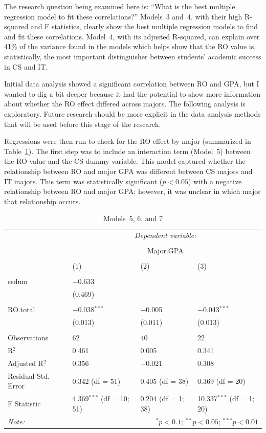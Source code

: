 The research question being examined here is: ``What is the best multiple regression model to fit these correlations?'' Models~3 and~4, with their high R-squared and F statistics, clearly show the best multiple regression models to find and fit these correlations. Model~4, with its adjusted R-squared, can explain over 41\% of the variance found in the models which helps show that the RO value is, statistically, the most important distinguisher between students' academic success in CS and IT.

Initial data analysis showed a significant correlation between RO and GPA, but I wanted to dig a bit deeper because it had the potential to show more information about whether the RO effect differed across majors. The following analysis is exploratory. Future research should be more explicit in the data analysis methods that will be used before this stage of the research.

Regressions were then run to check for the RO effect by major (summarized in Table~\ref{tab:models567}). The first step was to include an interaction term (Model~5) between the RO value and the CS dummy variable. This model captured whether the relationship between RO and major GPA was different between CS majors and IT majors. This term was statistically significant ($p<0.05$) with a negative relationship between RO and major GPA; however, it was unclear in which major that relationship occurs.

\begin{table}[!htbp] \centering
  \caption{Models~5, 6, and 7}
  \label{tab:models567}
  \begin{tabular}{@{\extracolsep{5pt}}llll}
    \toprule
     & \multicolumn{3}{c}{\textit{Dependent variable:}} \\
    \cline{2-4}
    \\[-1.8ex] & \multicolumn{3}{c}{Major.GPA} \\
    \\[-1.8ex] & (1) & (2) & (3)\\
    \hline \\[-1.8ex]
    csdum & $-$0.633 &  &  \\
      & (0.469) &  &  \\
      & & & \\
    RO.total & $-$0.038$^{***}$ & $-$0.005 & $-$0.043$^{***}$ \\
      & (0.013) & (0.011) & (0.013) \\
      & & & \\
    \midrule
    Observations & 62 & 40 & 22 \\
    R$^{2}$ & 0.461 & 0.005 & 0.341 \\
    Adjusted R$^{2}$ & 0.356 & $-$0.021 & 0.308 \\
    Residual Std. Error & 0.342 (df = 51) & 0.405 (df = 38) & 0.369 (df = 20) \\
    F Statistic & 4.369$^{***}$ (df = 10; 51) & 0.204 (df = 1; 38) & 10.337$^{***}$ (df = 1; 20) \\
    \bottomrule
    \textit{Note:}  & \multicolumn{3}{r}{$^{*}p<0.1$; $^{**}p<0.05$; $^{***}p<0.01$} \\
  \end{tabular}
\end{table}

